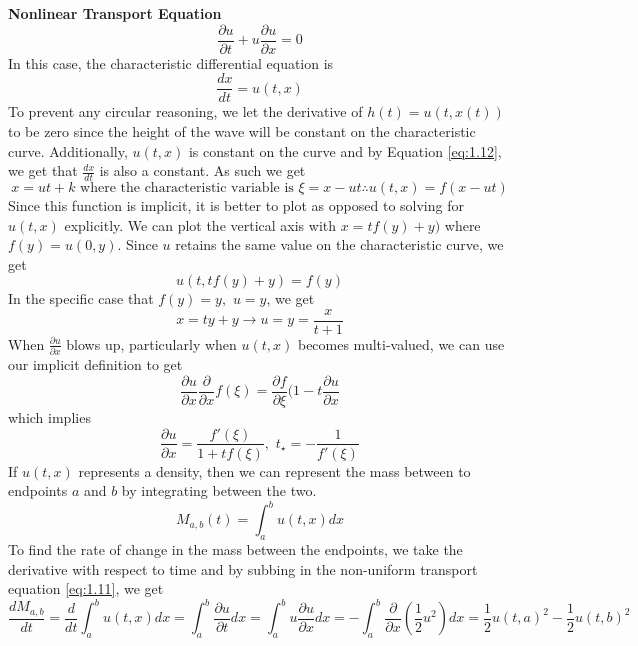 \documentclass{article}
\newcommand{\pd}[2]{\frac{\partial #1}{\partial #2}}
\newcommand{\od}[2]{\frac{d #1}{d #2}}
\numberwithin{equation}{section}
\begin{document}
\textbf{Nonlinear Transport Equation}
\begin{equation}
    \pd{u}{t} + u\pd{u}{x} = 0 \label{eq:1.11}
\end{equation}
In this case, the characteristic differential equation is 
\begin{equation}
    \od{x}{t} = u(t,x) \label{eq:1.12}
\end{equation}
To prevent any circular reasoning, we let the derivative of $h(t) = u(t,x(t))$ to be zero since the height of the wave will be constant on the characteristic curve. Additionally, $u(t,x)$ is constant on the curve and by Equation \eqref{eq:1.12}, we get that $\od{x}{t}$ is also a constant. As such we get 
\begin{equation*}
    x=ut+k \text{ where the characteristic variable is }\xi=x-ut \therefore u(t,x)=f(x-ut)
\end{equation*}
Since this function is implicit, it is better to plot as opposed to solving for $u(t,x)$ explicitly. We can plot the vertical axis with $x = tf(y)+y)$ where $f(y) = u(0,y)$. Since $u$ retains the same value on the characteristic curve, we get 
\begin{equation*}
    u(t,tf(y)+y) = f(y)
\end{equation*}
In the specific case that $f(y) = y, \hspace{4pt} u=y$, we get 
\begin{equation*}
    x=ty+y \rightarrow u=y=\frac{x}{t+1}
\end{equation*}
When $\pd{u}{x}$ blows up, particularly when $u(t,x)$ becomes multi-valued, we can use our implicit definition to get 
\begin{equation*}
    \pd{u}{x} \frac{\partial}{\partial x}f(\xi) = \pd{f}{\xi}(1-t\pd{u}{x}
\end{equation*}
which implies 
\begin{equation}
    \pd{u}{x} = \frac{f'(\xi)}{1+tf(\xi)}, \hspace{4pt} t_{\star} = -\frac{1}{f'(\xi)}
\end{equation}
If $u(t,x)$ represents a density, then we can represent the mass between to endpoints $a$ and $b$ by integrating between the two.
\begin{equation*}
    M_{a,b}(t) = \int^b_au(t,x)dx
\end{equation*}
To find the rate of change in the mass between the endpoints, we take the derivative with respect to time and by subbing in the non-uniform transport equation \eqref{eq:1.11}, we get 
\begin{equation}
    \od{M_{a,b}}{t} = \frac{d}{dt}\int^b_au(t,x)dx = \int^b_a \pd{u}{t}dx = \int^b_a u\pd{u}{x}dx =-\int^b_a\frac{\partial}{\partial x}(\frac{1}{2}u^2)dx = \frac{1}{2}u(t,a)^2-\frac{1}{2}u(t,b)^2 \label{eq:1.14}
\end{equation}
\end{document}
